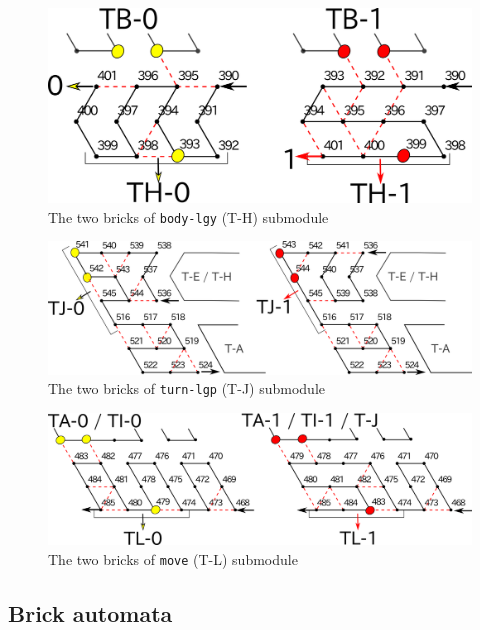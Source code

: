 \documentclass[runningheads]{llncs}
\begin{document}
\begin{figure}[h]
\centering
\includegraphics[width=0.7\linewidth]{Figs/body-lgy}
\caption{The two bricks of \texttt{body-lgy} (T-H) submodule}
\label{fig:body-lgy}
\end{figure}

\begin{figure}[h]
\centering
\includegraphics[width=\linewidth]{Figs/turn-lgp}
\caption{The two bricks of \texttt{turn-lgp} (T-J) submodule}
\label{fig:turn-lgp}
\end{figure}

\begin{figure}[h]
\centering
\includegraphics[width=\linewidth]{Figs/move.png}
\caption{The two bricks of \texttt{move} (T-L) submodule}
\label{fig:move}
\end{figure}

\clearpage

	\subsection{Brick automata}
	\label{ap_subsect:Turner_module_BA}
\end{document}
